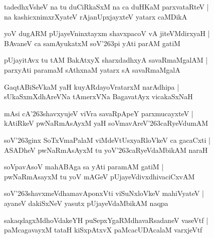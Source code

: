 \documentclass[twoside,12pt,openright]{book}
\def\S{\char'263}
\newcounter{shloka}[chapter]
\begin{document}
\begin{shloka}%
tadedhxVsheV na tu duCiRkaSxM na ca duHKaM parxvataRteV |\\
na kashicxnimxrXyateV rAjanUpxjayxteV yatarx caMDikA 
\end{shloka}

\begin{shloka}%
yoV dugARM pUjayeVninxtayxm shavxpacoV vA jiteVMdirxyaH |\\
BAvaneV ca samAyukatxM soV\S pi yAti parAM gatiM 
\end{shloka}

\begin{shloka}%
pUjayitAvx tu tAM BakAtxyX sharxdadhxyA savaRmaMgalAM |\\
parxyAti paramaM sAthxnaM yatarx sA savaRmaMgalA  
\end{shloka}

\begin{shloka}%
GaqtABiSeVkaM yaH kuyARdayoVratarxM narAdhipa |\\
sUkaSxmXdhAreVNa tAmerxVNa BagavatAyx vicakaSxNaH 
\end{shloka}

\begin{shloka}%
mAsi cA\S shavxyujeV viVra savaRpApeY parxmucayxteV |\\
kAtiRkeV pwNaRmAsAyxM yaH soVmavAreV\S caRyeVdumAM 
\end{shloka}

\begin{shloka}%
soV\S ginx SoTxVmaPalaM viMdeVtUsxyaRloVkeV ca gacaCxti |\\
ASADheV pwNaRmAsAyxM tu yoV\S caRyeVdaMbikAM naraH 
\end{shloka}

\begin{shloka}%
soVpavAsoV mahABAga sa yAti paramAM gatiM |\\
pwNaRmAsayxM tu yoV mAGeV pUjayeVdivxdhivaciCxvAM 
\end{shloka}

\begin{shloka}%
soV\S shavxmeVdhamavAponxVti viSuNxloVkeV mahiVyateV |\\
ayaneV dakiSxNeV yasutx pUjayeVdaMbikAM naqpa
\end{shloka}

\begin{shloka}%
sakaqdagxMdhoVdakeYH puSepxYgaRMdhavaRsadaneV vaseVtf |\\
paMcagavayxM tataH kiSxpAtxvX paMcacUDAcalaM varxjeVtf 
\end{shloka}
\end{document}
